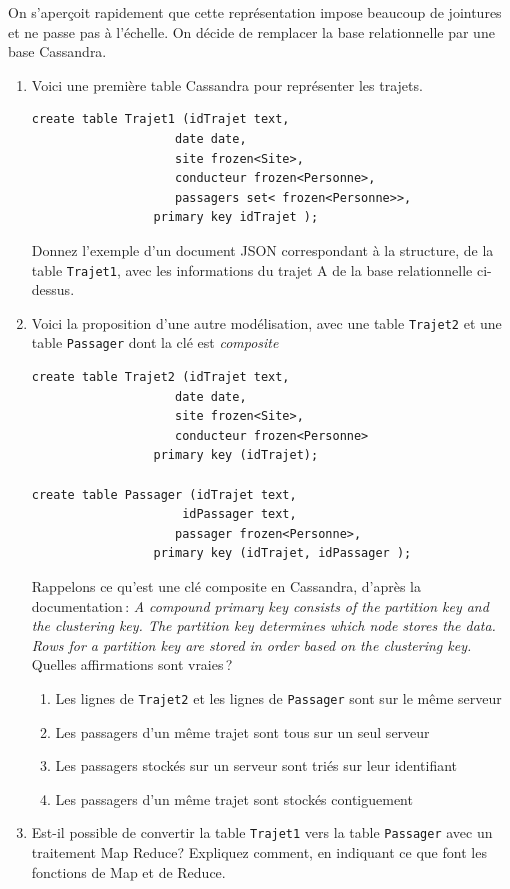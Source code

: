 \documentclass[10pt,a4paper]{article}
\begin{document}
\vspace*{0.2cm}

On s'aperçoit rapidement que cette représentation impose 
beaucoup de jointures et ne passe pas à l'échelle. 
On décide de remplacer la base relationnelle par une base Cassandra. 

\begin{enumerate}
  \item Voici une première table Cassandra pour représenter les trajets.
  
\begin{verbatim}
create table Trajet1 (idTrajet text, 
                    date date, 
                    site frozen<Site>, 
                    conducteur frozen<Personne>, 
                    passagers set< frozen<Personne>>,
                 primary key idTrajet );
\end{verbatim}

 Donnez l'exemple d'un  document JSON correspondant à la structure,
           de la table \texttt{Trajet1},
           avec les informations du trajet A de la base relationnelle ci-dessus.
           
  \item Voici la proposition d'une autre modélisation, avec une
    table \texttt{Trajet2} et une table \texttt{Passager} dont la clé est
      \emph{composite}
    
\begin{verbatim}
create table Trajet2 (idTrajet text, 
                    date date, 
                    site frozen<Site>, 
                    conducteur frozen<Personne>
                 primary key (idTrajet);

create table Passager (idTrajet text, 
                     idPassager text,
                    passager frozen<Personne>,
                 primary key (idTrajet, idPassager );
\end{verbatim}

Rappelons ce qu'est une clé composite en Cassandra, d'après la documentation\,: 
\textit{A compound primary key consists of the partition key and the clustering key. The partition key determines which node stores the data. Rows 
for a partition key are stored in order based on the clustering key.} Quelles affirmations
sont vraies\,?
\begin{enumerate}
  \item Les lignes de \texttt{Trajet2} et les lignes de \texttt{Passager} sont sur le même serveur
      \item Les passagers d'un même trajet sont tous sur un seul serveur 
       \item Les passagers stockés sur un serveur sont triés sur leur identifiant
       \item Les passagers d'un même trajet sont stockés contiguement
\end{enumerate}  

  \item Est-il possible de convertir la table \texttt{Trajet1} 
  vers la table \texttt{Passager} avec un traitement
        Map Reduce? Expliquez comment, en indiquant ce que font les fonctions de Map et de Reduce.
\end{enumerate}
\end{document}
